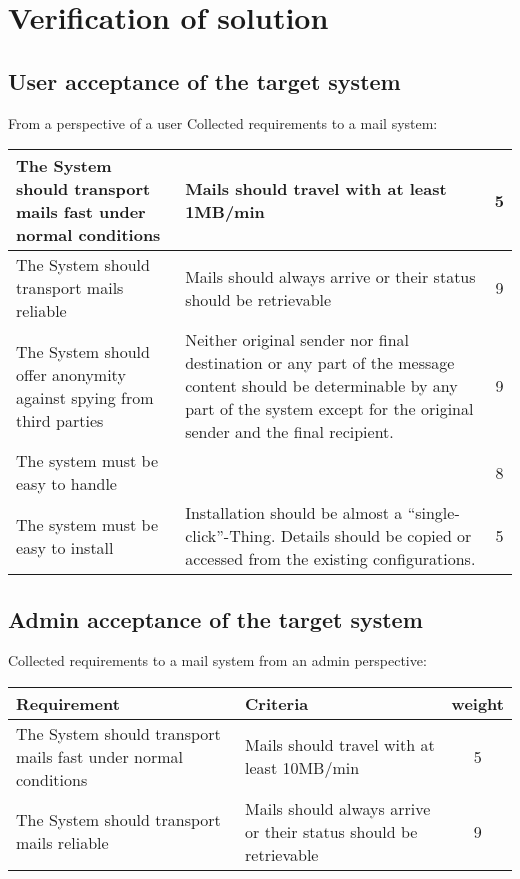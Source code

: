 \chapter{Verification of solution}
\section{User acceptance of the target system}
From a perspective of a user 
Collected requirements to a mail system:\par
\begin{center}
\tablelasttail{\hline}
\begin{supertabular}{|p{5cm}|p{5cm}|c|}\hline
The System should transport mails fast under normal conditions & Mails should travel with at least 1MB/min & 5\\\hline
The System should transport mails reliable & Mails should always arrive or their status should be retrievable & 9\\\hline
The System should offer anonymity against spying from third parties & Neither original sender nor final destination or any part of the message content should be determinable by any part of the system except for the original sender and the final recipient.& 9\\\hline
The system must be easy to handle &&8\\\hline
The system must be easy to install & Installation should be almost a ``single-click''-Thing. Details should be copied or accessed from the existing configurations.&5\\\hline
\end{supertabular}
\end{center}

\section{Admin acceptance of the target system}
Collected requirements to a mail system from an admin perspective:\par
\begin{tabular}{|p{5cm}|p{5cm}|c|}\hline
Requirement& Criteria& weight\\\hline
The System should transport mails fast under normal conditions & Mails should travel with at least 10MB/min & 5\\
The System should transport mails reliable & Mails should always arrive or their status should be retrievable & 9\\
\hline\end{tabular}

